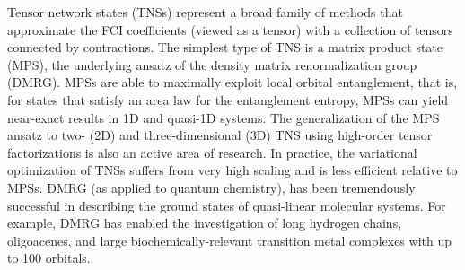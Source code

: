 \documentclass[aip,jcp,amsmath,amssymb, preprint]{revtex4-1}
\newcommand{\add}[1]{\colorbox{goodgreen}{\textcolor{white}{\footnotesize  \fontfamily{phv}\selectfont +}}
    \textcolor{goodgreen}{{#1}}\xspace}
\begin{document}


Tensor network states (TNSs) represent a broad family of methods that approximate the FCI coefficients (viewed as a tensor) with a collection of tensors connected by contractions.
The simplest type of TNS is a matrix product state (MPS), the underlying ansatz\cite{ostlund1995thermodynamic, dukelsky1998equivalence, schollwock2011density} of the density matrix renormalization group (DMRG).\cite{White1992DensityMatrix}
MPSs are able to maximally exploit local orbital entanglement, that is, for states that satisfy an area law for the entanglement entropy, MPSs can yield near-exact results in 1D and quasi-1D systems.
\cite{Eisert2009AreaLaws,Evenbly2011TensorNetwork}
The generalization of the MPS ansatz to two- (2D) and three-dimensional (3D) TNS using high-order tensor factorizations is also an active area of research.\cite{Evenbly2011TensorNetwork, Murg2010SimulatingStrongly, Nakatani2013EfficientTree} In practice, the variational optimization of TNSs suffers from very high scaling and is less efficient relative to MPSs.
DMRG (as applied to quantum chemistry),\cite{Chan2002HighlyCorrelated, chan2011density, Moritz2005RelitivisticDMRG, Kurashige2009HighPerformance, Olivares2015TheAbinitio} has been tremendously successful in describing the ground states of quasi-linear molecular systems.
For example, DMRG has enabled the investigation of long hydrogen chains,\cite{Chan2002HighlyCorrelated, Hachmann2006MultireferenceCorrelation, Mitrushchenkov2012OnTheImportance, Wouters2012LongitudinalStatic, Ma2013AssessmentOf} oligoacenes,\cite{Hachmann2007TheRadical, Raghu2002StructuralAnd, Raghu2002DensityMatrix} and large biochemically-relevant transition metal complexes with up to 100 orbitals.\cite{Kurashige2013EntangledQuantum, Sharma2014LowEnergy}
\end{document}
